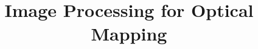 \documentclass{bmcart}
\begin{document}
\begin{frontmatter}

\begin{fmbox}


\title{Image Processing for Optical Mapping}


\author[
   addressref={aff1},                   %
   corref={aff1},                       %
   email={pravindran@wisc.edu}   %
]{ }

\author[
   addressref={aff1},
   email={agupta29@wisc.edu}
]{ }


\address[id=aff1]{%
  , %
  ,                     %
  ,                              %
}


\end{fmbox}
\end{frontmatter}
\end{document}
